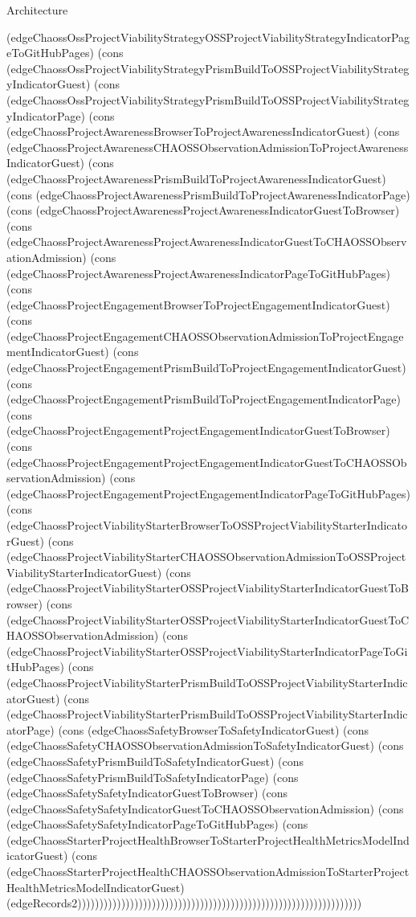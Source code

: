 \begin{lexlean}{Architecture}
\begin{semanticmodule}
{(edgeChaossOssProjectViabilityStrategyOSSProjectViabilityStrategyIndicatorPageToGitHubPages) (cons (edgeChaossOssProjectViabilityStrategyPrismBuildToOSSProjectViabilityStrategyIndicatorGuest) (cons (edgeChaossOssProjectViabilityStrategyPrismBuildToOSSProjectViabilityStrategyIndicatorPage) (cons (edgeChaossProjectAwarenessBrowserToProjectAwarenessIndicatorGuest) (cons (edgeChaossProjectAwarenessCHAOSSObservationAdmissionToProjectAwarenessIndicatorGuest) (cons (edgeChaossProjectAwarenessPrismBuildToProjectAwarenessIndicatorGuest) (cons (edgeChaossProjectAwarenessPrismBuildToProjectAwarenessIndicatorPage) (cons (edgeChaossProjectAwarenessProjectAwarenessIndicatorGuestToBrowser) (cons (edgeChaossProjectAwarenessProjectAwarenessIndicatorGuestToCHAOSSObservationAdmission) (cons (edgeChaossProjectAwarenessProjectAwarenessIndicatorPageToGitHubPages) (cons (edgeChaossProjectEngagementBrowserToProjectEngagementIndicatorGuest) (cons (edgeChaossProjectEngagementCHAOSSObservationAdmissionToProjectEngagementIndicatorGuest) (cons (edgeChaossProjectEngagementPrismBuildToProjectEngagementIndicatorGuest) (cons (edgeChaossProjectEngagementPrismBuildToProjectEngagementIndicatorPage) (cons (edgeChaossProjectEngagementProjectEngagementIndicatorGuestToBrowser) (cons (edgeChaossProjectEngagementProjectEngagementIndicatorGuestToCHAOSSObservationAdmission) (cons (edgeChaossProjectEngagementProjectEngagementIndicatorPageToGitHubPages) (cons (edgeChaossProjectViabilityStarterBrowserToOSSProjectViabilityStarterIndicatorGuest) (cons (edgeChaossProjectViabilityStarterCHAOSSObservationAdmissionToOSSProjectViabilityStarterIndicatorGuest) (cons (edgeChaossProjectViabilityStarterOSSProjectViabilityStarterIndicatorGuestToBrowser) (cons (edgeChaossProjectViabilityStarterOSSProjectViabilityStarterIndicatorGuestToCHAOSSObservationAdmission) (cons (edgeChaossProjectViabilityStarterOSSProjectViabilityStarterIndicatorPageToGitHubPages) (cons (edgeChaossProjectViabilityStarterPrismBuildToOSSProjectViabilityStarterIndicatorGuest) (cons (edgeChaossProjectViabilityStarterPrismBuildToOSSProjectViabilityStarterIndicatorPage) (cons (edgeChaossSafetyBrowserToSafetyIndicatorGuest) (cons (edgeChaossSafetyCHAOSSObservationAdmissionToSafetyIndicatorGuest) (cons (edgeChaossSafetyPrismBuildToSafetyIndicatorGuest) (cons (edgeChaossSafetyPrismBuildToSafetyIndicatorPage) (cons (edgeChaossSafetySafetyIndicatorGuestToBrowser) (cons (edgeChaossSafetySafetyIndicatorGuestToCHAOSSObservationAdmission) (cons (edgeChaossSafetySafetyIndicatorPageToGitHubPages) (cons (edgeChaossStarterProjectHealthBrowserToStarterProjectHealthMetricsModelIndicatorGuest) (cons (edgeChaossStarterProjectHealthCHAOSSObservationAdmissionToStarterProjectHealthMetricsModelIndicatorGuest) (edgeRecords2)))))))))))))))))))))))))))))))))))))))))))))))))))))))))))))))))
}


\end{semanticmodule}
\end{lexlean}
